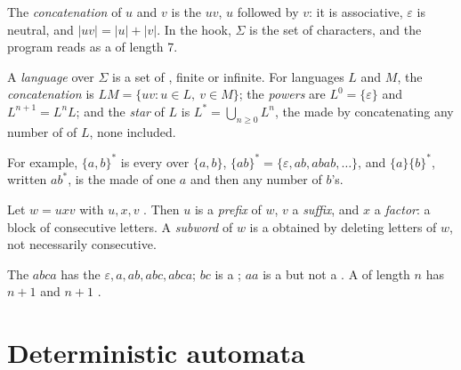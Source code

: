 The \emph{concatenation} of $u$ and $v$ is the  $uv$, $u$ followed by $v$: it is associative, $\varepsilon$ is
neutral, and $|uv| = |u| + |v|$. In the hook, $\Sigma$ is the set of characters, and the program reads
 as a  of length 7.

\begin{definition}[Language]\label{def:b2:finite-automata:language}
A \emph{language} over $\Sigma$ is a set of , finite or infinite. For languages $L$
and $M$, the \emph{concatenation} is $LM = \{uv : u \in L,\ v \in M\}$; the \emph{powers} are $L^0 = \{\varepsilon\}$
and $L^{n+1} = L^n L$; and the \emph{star} of $L$ is $L^* = \bigcup_{n \ge 0} L^n$, the  made by concatenating
any number of  of $L$, none included.
\end{definition}

For example, $\{a, b\}^*$ is every  over $\{a, b\}$, $\{ab\}^* = \{\varepsilon, ab, abab, \dots\}$, and
$\{a\}\{b\}^*$, written $ab^*$, is the  made of one $a$ and then any number of $b$'s.

\begin{definition}\label{def:b2:finite-automata:factor}
Let $w = uxv$ with $u, x, v$ . Then $u$ is a \emph{prefix} of $w$, $v$ a
\emph{suffix}, and $x$ a \emph{factor}: a block of consecutive letters. A
\emph{subword} of $w$ is a  obtained by deleting letters of $w$, not necessarily consecutive.
\end{definition}

The  $abca$ has the  $\varepsilon, a, ab, abc, abca$; $bc$ is a ; $aa$ is a  but not a
. A  of length $n$ has $n + 1$  and $n + 1$ .

\section{Deterministic automata}\label{sec:b2:finite-automata:dfa}

